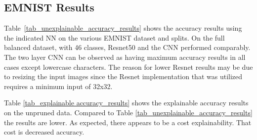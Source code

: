 \documentclass[conference]{IEEEtran}
\begin{document}

\subsection{EMNIST Results}
\label{emnist_results}

Table~\ref{tab_unexplainable_accuracy_results} shows the accuracy results using
the indicated NN on the various EMNIST dataset and splits. On the full balanced
dataset, with 46 classes, Resnet50 and the CNN performed comparably. The two
layer CNN can be observed as having maximum accuracy results in all cases except
lowercase characters.  The reason for lower Resnet results may be due to
resizing the input images since the Resnet implementation that was utilized
requires a minimum input of 32x32.  

\begin{table}
    \centering
    \caption{Unexplainable accuracy results on various balanced EMNIST data sets with differing NN models}
    \label{tab_unexplainable_accuracy_results}
\end{table}

Table \ref{tab_explainable accuracy_results} shows the explainable accuracy
results on the unpruned data. Compared to Table
\ref{tab_unexplainable_accuracy_results} the results are lower.  As expected,
there appears to be a cost explainability.  That cost is decreased accuracy.
\end{document}
